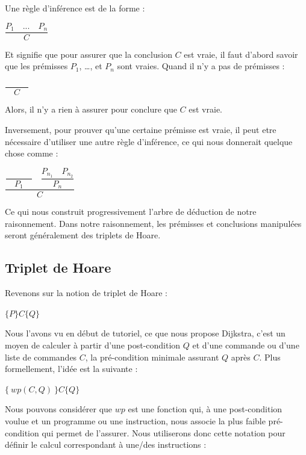 \documentclass[12pt,francais,]{scrbook}
\begin{document}
Une règle d'inférence est de la forme :

\begin{center} \(\dfrac{P_1 \quad ... \quad P_n}{C}\) \end{center}

Et signifie que pour assurer que la conclusion \(C\) est vraie, il faut
d'abord savoir que les prémisses \(P_1\), \ldots{}, et \(P_n\) sont
vraies. Quand il n'y a pas de prémisses :

\begin{center} \(\dfrac{}{\quad C \quad}\) \end{center}

Alors, il n'y a rien à assurer pour conclure que \(C\) est vraie.

Inversement, pour prouver qu'une certaine prémisse est vraie, il peut
etre nécessaire d'utiliser une autre règle d'inférence, ce qui nous
donnerait quelque chose comme :

\begin{center}
\(\dfrac{\dfrac{}{\quad P_1\quad} \quad \dfrac{P_{n_1}\quad P_{n_2}}{P_n}}{C}\)
\end{center}

Ce qui nous construit progressivement l'arbre de déduction de notre
raisonnement. Dans notre raisonnement, les prémisses et conclusions
manipulées seront généralement des triplets de Hoare.

\subsection{Triplet de Hoare}\label{triplet-de-hoare}

Revenons sur la notion de triplet de Hoare :

\begin{center} \(\{ P \} C \{ Q \}\) \end{center}

Nous l'avons vu en début de tutoriel, ce que nous propose Dijkstra,
c'est un moyen de calculer à partir d'une post-condition \(Q\) et d'une
commande ou d'une liste de commandes \(C\), la pré-condition minimale
assurant \(Q\) après \(C\). Plus formellement, l'idée est la suivante :

\begin{center} \(\{\ wp(C,Q)\ \} C \{ Q \}\) \end{center}

Nous pouvons considérer que \(wp\) est une fonction qui, à une
post-condition voulue et un programme ou une instruction, nous associe
la plus faible pré-condition qui permet de l'assurer. Nous utiliserons
donc cette notation pour définir le calcul correspondant à une/des
instructions :
\end{document}
